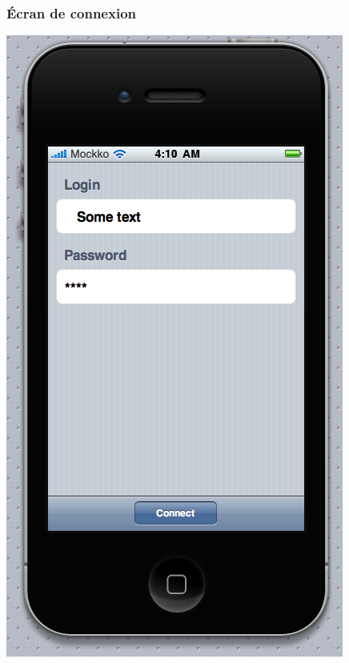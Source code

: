 \documentclass[a4paper,12pt]{report}
\begin{document}
\begin{onehalfspace}
\centering
\subsubsection{Écran de connexion}
\includegraphics[height=\thehauteurscreen cm]{img/1_login.png}


\end{onehalfspace}
\end{document}
